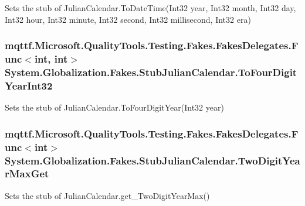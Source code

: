 Sets the stub of Julian\-Calendar.\-To\-Date\-Time(\-Int32 year, Int32 month, Int32 day, Int32 hour, Int32 minute, Int32 second, Int32 millisecond, Int32 era)

\hypertarget{class_system_1_1_globalization_1_1_fakes_1_1_stub_julian_calendar_a4978d436d6f9166168f50720b4f4fa73}{
\subsubsection[{To\-Four\-Digit\-Year\-Int32}]{\setlength{\rightskip}{0pt plus 5cm}mqttf.\-Microsoft.\-Quality\-Tools.\-Testing.\-Fakes.\-Fakes\-Delegates.\-Func$<$int, int$>$ System.\-Globalization.\-Fakes.\-Stub\-Julian\-Calendar.\-To\-Four\-Digit\-Year\-Int32}}\label{class_system_1_1_globalization_1_1_fakes_1_1_stub_julian_calendar_a4978d436d6f9166168f50720b4f4fa73}


Sets the stub of Julian\-Calendar.\-To\-Four\-Digit\-Year(\-Int32 year)

\hypertarget{class_system_1_1_globalization_1_1_fakes_1_1_stub_julian_calendar_a9a679a9e4d39b1f805e42495c8d98612}{
\subsubsection[{Two\-Digit\-Year\-Max\-Get}]{\setlength{\rightskip}{0pt plus 5cm}mqttf.\-Microsoft.\-Quality\-Tools.\-Testing.\-Fakes.\-Fakes\-Delegates.\-Func$<$int$>$ System.\-Globalization.\-Fakes.\-Stub\-Julian\-Calendar.\-Two\-Digit\-Year\-Max\-Get}}\label{class_system_1_1_globalization_1_1_fakes_1_1_stub_julian_calendar_a9a679a9e4d39b1f805e42495c8d98612}


Sets the stub of Julian\-Calendar.\-get\-\_\-\-Two\-Digit\-Year\-Max()

